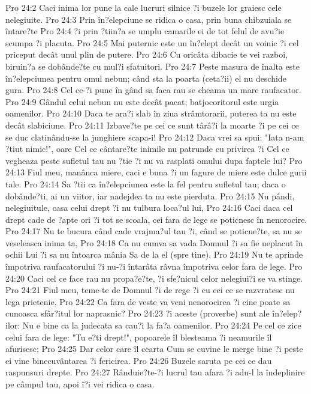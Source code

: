 Pro 24:2  Caci inima lor pune la cale lucruri silnice ?i buzele lor graiesc cele nelegiuite.
Pro 24:3  Prin în?elepciune se ridica o casa, prin buna chibzuiala se întare?te
Pro 24:4  ?i prin ?tiin?a se umplu camarile ei de tot felul de avu?ie scumpa ?i placuta.
Pro 24:5  Mai puternic este un în?elept decât un voinic ?i cel priceput decât unul plin de putere.
Pro 24:6  Cu oricâta dibacie te vei razboi, biruin?a se dobânde?te cu mul?i sfatuitori.
Pro 24:7  Peste masura de înalta este în?elepciunea pentru omul nebun; când sta la poarta (ceta?ii) el nu deschide gura.
Pro 24:8  Cel ce-?i pune în gând sa faca rau se cheama un mare raufacator.
Pro 24:9  Gândul celui nebun nu este decât pacat; batjocoritorul este urgia oamenilor.
Pro 24:10  Daca te ara?i slab în ziua strâmtorarii, puterea ta nu este decât slabiciune.
Pro 24:11  Izbave?te pe cei ce sunt târâ?i la moarte ?i pe cei ce se duc clatinându-se la junghiere scapa-i!
Pro 24:12  Daca vrei sa spui: "Iata n-am ?tiut nimic!", oare Cel ce cântare?te inimile nu patrunde cu privirea ?i Cel ce vegheaza peste sufletul tau nu ?tie ?i nu va rasplati omului dupa faptele lui?
Pro 24:13  Fiul meu, manânca miere, caci e buna ?i un fagure de miere este dulce gurii tale.
Pro 24:14  Sa ?tii ca în?elepciunea este la fel pentru sufletul tau; daca o dobânde?ti, ai un viitor, iar nadejdea ta nu este pierduta.
Pro 24:15  Nu pândi, nelegiuitule, casa celui drept ?i nu tulbura loca?ul lui,
Pro 24:16  Caci daca cel drept cade de ?apte ori ?i tot se scoala, cei fara de lege se poticnesc în nenorocire.
Pro 24:17  Nu te bucura când cade vrajma?ul tau ?i, când se poticne?te, sa nu se veseleasca inima ta,
Pro 24:18  Ca nu cumva sa vada Domnul ?i sa fie neplacut în ochii Lui ?i sa nu întoarca mânia Sa de la el (spre tine).
Pro 24:19  Nu te aprinde împotriva raufacatorului ?i nu-?i întarâta râvna împotriva celor fara de lege.
Pro 24:20  Caci cel ce face rau nu propa?e?te, ?i sfe?nicul celor nelegiui?i se va stinge.
Pro 24:21  Fiul meu, teme-te de Domnul ?i de rege ?i cu cei ce se razvratesc nu lega prietenie,
Pro 24:22  Ca fara de veste va veni nenorocirea ?i cine poate sa cunoasca sfâr?itul lor naprasnic?
Pro 24:23  ?i aceste (proverbe) sunt ale în?elep?ilor: Nu e bine ca la judecata sa cau?i la fa?a oamenilor.
Pro 24:24  Pe cel ce zice celui fara de lege: "Tu e?ti drept!", popoarele îl blesteama ?i neamurile îl afurisesc;
Pro 24:25  Dar celor care îl cearta Cum se cuvine le merge bine ?i peste ei vine binecuvântarea ?i fericirea.
Pro 24:26  Buzele saruta pe cei ce dau raspunsuri drepte.
Pro 24:27  Rânduie?te-?i lucrul tau afara ?i adu-l la îndeplinire pe câmpul tau, apoi î?i vei ridica o casa.

